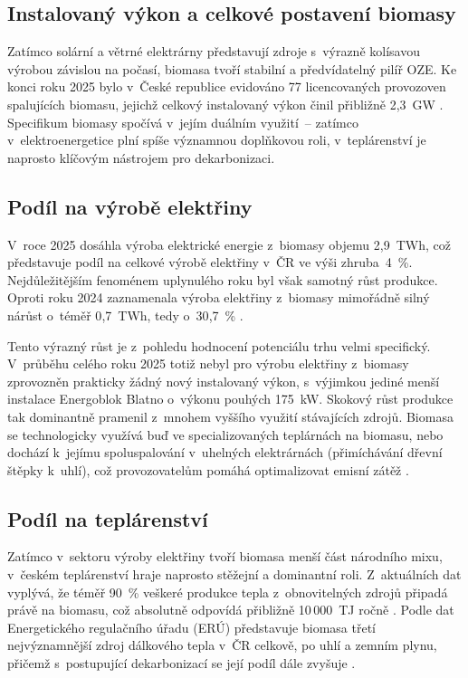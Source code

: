 \subsection{Instalovaný výkon a celkové postavení biomasy}
 
Zatímco solární a větrné elektrárny představují zdroje s~výrazně kolísavou výrobou závislou na počasí, biomasa tvoří stabilní a předvídatelný pilíř OZE. Ke konci roku 2025 bylo v~České republice evidováno 77 licencovaných provozoven spalujících biomasu, jejichž celkový instalovaný výkon činil přibližně 2{,}3~GW \citep{oEnergetice2025}. Specifikum biomasy spočívá v~jejím duálním využití~-- zatímco v~elektroenergetice plní spíše významnou doplňkovou roli, v~teplárenství je naprosto klíčovým nástrojem pro dekarbonizaci.
 
\subsection{Podíl na výrobě elektřiny}
 
V~roce 2025 dosáhla výroba elektrické energie z~biomasy objemu 2{,}9~TWh, což představuje podíl na celkové výrobě elektřiny v~ČR ve výši zhruba~4~\%. Nejdůležitějším fenoménem uplynulého roku byl však samotný růst produkce. Oproti roku 2024 zaznamenala výroba elektřiny z~biomasy mimořádně silný nárůst o~téměř 0{,}7~TWh, tedy o~30{,}7~\% \citep{oEnergetice2025}.
 
Tento výrazný růst je z~pohledu hodnocení potenciálu trhu velmi specifický. V~průběhu celého roku 2025 totiž nebyl pro výrobu elektřiny z~biomasy zprovozněn prakticky žádný nový instalovaný výkon, s~výjimkou jediné menší instalace Energoblok Blatno o~výkonu pouhých 175~kW. Skokový růst produkce tak dominantně pramenil z~mnohem vyššího využití stávajících zdrojů. Biomasa se technologicky využívá buď ve specializovaných teplárnách na biomasu, nebo dochází k~jejímu spoluspalování v~uhelných elektrárnách (přimíchávání dřevní štěpky k~uhlí), což provozovatelům pomáhá optimalizovat emisní zátěž \citep{oEnergetice2025}.
 
 
\subsection{Podíl na teplárenství}
 
Zatímco v~sektoru výroby elektřiny tvoří biomasa menší část národního mixu, v~českém teplárenství hraje naprosto stěžejní a dominantní roli. Z~aktuálních dat vyplývá, že téměř 90~\% veškeré produkce tepla z~obnovitelných zdrojů připadá právě na biomasu, což absolutně odpovídá přibližně 10\,000~TJ ročně \citep{oEnergetice2025}. Podle dat Energetického regulačního úřadu (ERÚ) představuje biomasa třetí nejvýznamnější zdroj dálkového tepla v~ČR celkově, po uhlí a zemním plynu, přičemž s~postupující dekarbonizací se její podíl dále zvyšuje \citep{FaktaOKlimatu2025}.
 
